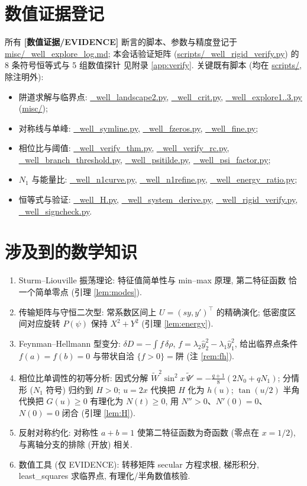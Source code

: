 \documentclass[UTF8]{ctexart}
\newcommand{\EVID}{\textbf{[数值证据/EVIDENCE]}}
\begin{document}
\section{数值证据登记}

所有 \EVID{} 断言的脚本、参数与精度登记于
\url{misc/_well_explore_log.md}; 本会话验证矩阵
(\url{scripts/_well_rigid_verify.py}) 的 8 条符号恒等式与 5 组数值探针
见附录 \ref{app:verify}. 关键既有脚本 (均在 \url{scripts/}, 除注明外):
\begin{itemize}\setlength{\itemsep}{0pt}\raggedright
	\item 阱道求解与临界点: \url{_well_landscape2.py}, \url{_well_crit.py}, \url{_well_explore1..3.py} (\url{misc/});
	\item 对称线与单峰: \url{_well_symline.py}, \url{_well_fzeros.py}, \url{_well_fine.py};
	\item 相位比与阈值: \url{_well_verify_thm.py}, \url{_well_verify_rc.py}, \url{_well_branch_threshold.py}, \url{_well_psitilde.py}, \url{_well_psi_factor.py};
	\item $N_1$ 与能量比: \url{_well_n1curve.py}, \url{_well_n1refine.py}, \url{_well_energy_ratio.py};
	\item 恒等式与验证: \url{_well_H.py}, \url{_well_system_derive.py}, \url{_well_rigid_verify.py}, \url{_well_signcheck.py}.
\end{itemize}

\section{涉及到的数学知识}

\begin{enumerate}
	\item Sturm--Liouville 振荡理论: 特征值简单性与 min--max 原理, 第二特征函数
		恰一个简单零点 (引理 \ref{lem:modes}).
	\item 传输矩阵与守恒二次型: 常系数区间上 $U=(sy,y')^\top$ 的精确演化;
		低密度区间对应旋转 $P(\psi)$ 保持 $X^2+Y^2$ (引理 \ref{lem:energy}).
	\item Feynman--Hellmann 型变分: $\delta D=-\int f\,\delta\rho$,
		$f=\lambda_2\hat y_2^2-\lambda_1\hat y_1^2$, 给出临界点条件
		$f(a)=f(b)=0$ 与带状自洽 $\{f>0\}=\text{阱}$ (注 \ref{rem:fh}).
	\item 相位比单调性的初等分析: 因式分解
		$\widetilde W^2\sin^2x\,\widetilde\Psi'=-\frac{q+1}{8}(2N_0+qN_1)$;
		分情形 ($N_1$ 符号) 归约到 $H>0$; $u=2x$ 代换把 $H$ 化为 $h(u)$;
		$\tan(u/2)$ 半角代换把 $G(u)\ge0$ 有理化为 $N(t)\ge0$,
		用 $N''>0$、$N'(0)=0$、$N(0)=0$ 闭合 (引理 \ref{lem:H}).
	\item 反射对称约化: 对称性 $a+b=1$ 使第二特征函数为奇函数 (零点在 $x=1/2$),
		与离轴分支的排除 (开放) 相关.
	\item 数值工具 (仅 EVIDENCE): 转移矩阵 secular 方程求根, 梯形积分,
		least\_squares 求临界点, 有理化/半角数值核验.
\end{enumerate}
\end{document}
